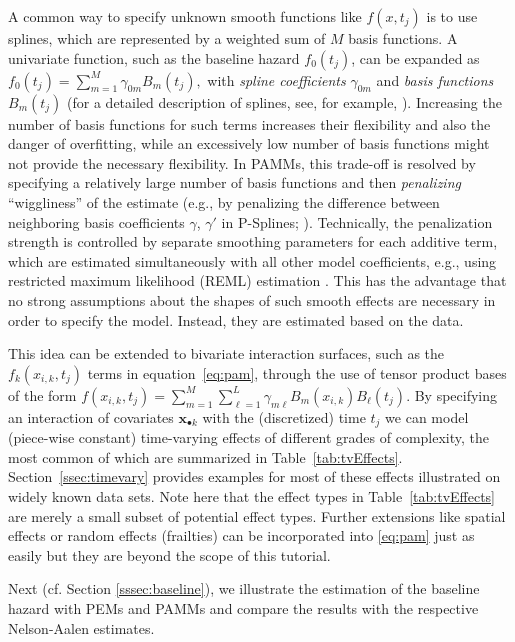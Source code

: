\documentclass[submit]{smj}
\newcommand{\bfx}{\mathbf{x}}
\begin{document}
A common way to specify unknown smooth functions like $f(x, t_j)$ is to
use splines, which are represented by a weighted sum of $M$ basis functions.
A univariate function, such as the baseline hazard $f_0(t_j)$, can be expanded as
$f_{0}(t_j)=\sum_{m=1}^{M}\gamma_{0m}B_m(t_j),$ with {\it spline coefficients}
$\gamma_{0m}$ and \emph{basis functions} $B_m(t_j)$
(for a detailed description of splines, see, for example, \citealp{RupWanCar:2003}).
Increasing the number of basis functions for such terms increases their
flexibility and also the danger of overfitting, while
an excessively low number of basis functions might not provide the necessary flexibility. In
PAMMs, this trade-off is resolved by specifying a relatively large number of
basis functions and then \emph{penalizing} ``wiggliness'' of the estimate
(e.g., by penalizing the difference between neighboring basis coefficients
$\gamma$, $\gamma'$ in P-Splines; \citealp{Eilers1996}).
Technically, the penalization strength is controlled by separate smoothing parameters
for each additive term, which are estimated simultaneously with
all other model coefficients, e.g., using restricted maximum likelihood (REML)
estimation \citep{Wood:2011}. This has the advantage that no strong assumptions
about the shapes of such smooth effects are necessary in order to specify the
model. Instead, they are estimated based on the data.


This idea can be extended to bivariate interaction surfaces, such as the
$f_k(x_{i,k}, t_j)$ terms in equation~\eqref{eq:pam}, through the use of tensor product bases of the form
$f(x_{i,k},t_j)=\sum_{m=1}^M\sum_{\ell=1}^{L}\gamma_{m\ell}B_m(x_{i,k})B_\ell(t_j)$.
By specifying an interaction of covariates $\bfx_{\bullet k}$ with the
(discretized) time $t_j$ we can model (piece-wise constant) time-varying effects
of different grades of complexity, the most common of which are summarized in
Table~\ref{tab:tvEffects}.
Section~\ref{ssec:timevary} provides examples for most of these effects illustrated
on widely known data sets. Note here that the effect types in Table~\ref{tab:tvEffects} are merely a small subset of potential effect types. Further extensions like spatial effects or random effects (frailties) can be incorporated into \eqref{eq:pam} just as easily but they are beyond the scope of this tutorial.

Next (cf. Section \ref{sssec:baseline}), we illustrate the estimation of the
baseline hazard with PEMs and PAMMs and compare the results with the respective
Nelson-Aalen estimates.
\end{document}
